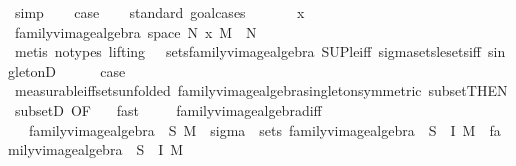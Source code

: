 \begin{isabellebody}
\ simp\isanewline
\ \ \isamarkupfalse%
\ {\isacharquery}{\kern0pt}case\isanewline
\ \ \isamarkupfalse%
\ {\isacharparenleft}{\kern0pt}standard{\isacharcomma}{\kern0pt}\ goal{\isacharunderscore}{\kern0pt}cases{\isacharparenright}{\kern0pt}\isanewline
\ \ \ \ \isamarkupfalse%
\ {\isacharparenleft}{\kern0pt}{}\ x{\isacharparenright}{\kern0pt}\isanewline
\ \ \ \ \isamarkupfalse%
\ {\isachardoublequoteopen}family{\isacharunderscore}{\kern0pt}vimage{\isacharunderscore}{\kern0pt}algebra\ {\isacharparenleft}{\kern0pt}space\ N{\isacharparenright}{\kern0pt}\ {\isacharbraceleft}{\kern0pt}x{\isacharbraceright}{\kern0pt}\ M\ {\isasymsubseteq}\ N{\isachardoublequoteclose}\ \isamarkupfalse%
\ {\isacharparenleft}{\kern0pt}metis\ {\isacharparenleft}{\kern0pt}no{\isacharunderscore}{\kern0pt}types{\isacharcomma}{\kern0pt}\ lifting{\isacharparenright}{\kern0pt}\ {}\ {}\ sets{\isacharunderscore}{\kern0pt}family{\isacharunderscore}{\kern0pt}vimage{\isacharunderscore}{\kern0pt}algebra\ SUP{\isacharunderscore}{\kern0pt}le{\isacharunderscore}{\kern0pt}iff\ sigma{\isacharunderscore}{\kern0pt}sets{\isacharunderscore}{\kern0pt}le{\isacharunderscore}{\kern0pt}sets{\isacharunderscore}{\kern0pt}iff\ singletonD{\isacharparenright}{\kern0pt}\isanewline
\ \ \ \ \isamarkupfalse%
\ {\isacharquery}{\kern0pt}case\ \isamarkupfalse%
\ measurable{\isacharunderscore}{\kern0pt}iff{\isacharunderscore}{\kern0pt}sets{\isacharbrackleft}{\kern0pt}unfolded\ family{\isacharunderscore}{\kern0pt}vimage{\isacharunderscore}{\kern0pt}algebra{\isacharunderscore}{\kern0pt}singleton{\isacharbrackleft}{\kern0pt}symmetric{\isacharbrackright}{\kern0pt}{\isacharbrackright}{\kern0pt}\ subset{\isacharbrackleft}{\kern0pt}THEN\ subsetD{\isacharcomma}{\kern0pt}\ OF\ {}{\isacharbrackright}{\kern0pt}\ \isamarkupfalse%
\ fast\ \isanewline
\ \ \isamarkupfalse%
\isanewline
{}\isamarkupfalse%
%
\endisatagproof
{\isafoldproof}%
%
\isadelimproof
\isanewline
%
\endisadelimproof
\isanewline
{}\isamarkupfalse%
\ family{\isacharunderscore}{\kern0pt}vimage{\isacharunderscore}{\kern0pt}algebra{\isacharunderscore}{\kern0pt}diff{\isacharcolon}{\kern0pt}\isanewline
\ \ \ {\isachardoublequoteopen}family{\isacharunderscore}{\kern0pt}vimage{\isacharunderscore}{\kern0pt}algebra\ {\isasymOmega}\ S\ M\ {\isacharequal}{\kern0pt}\ sigma\ {\isasymOmega}\ {\isacharparenleft}{\kern0pt}sets\ {\isacharparenleft}{\kern0pt}family{\isacharunderscore}{\kern0pt}vimage{\isacharunderscore}{\kern0pt}algebra\ {\isasymOmega}\ {\isacharparenleft}{\kern0pt}S\ {\isacharminus}{\kern0pt}\ I{\isacharparenright}{\kern0pt}\ M{\isacharparenright}{\kern0pt}\ {\isasymunion}\ family{\isacharunderscore}{\kern0pt}vimage{\isacharunderscore}{\kern0pt}algebra\ {\isasymOmega}\ {\isacharparenleft}{\kern0pt}S\ {\isasyminter}\ I{\isacharparenright}{\kern0pt}\ M{\isacharparenright}{\kern0pt}{\isachardoublequoteclose}\isanewline

\end{isabellebody}
